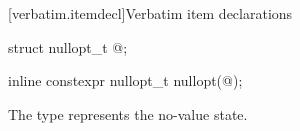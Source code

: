 [verbatim.itemdecl]{Verbatim item declarations}

\begin{itemdecl}
struct nullopt_t {@\seebelow@};

inline constexpr nullopt_t nullopt(@\unspec@);
\end{itemdecl}

\begin{itemdescr}
\pnum
\remarks
The type represents the no-value state.
\end{itemdescr}
